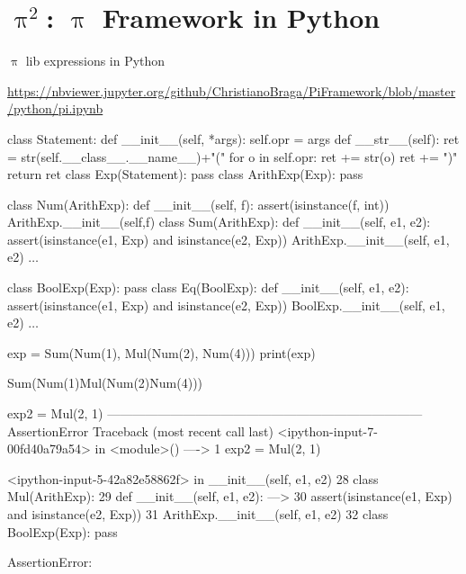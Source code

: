 \documentclass{beamer}
\begin{document}
\section{$\uppi^2$: $\uppi$ Framework in Python}

\begin{frame}{{\color{red}$\uppi$ lib} expressions in Python}

{\footnotesize\url{https://nbviewer.jupyter.org/github/ChristianoBraga/PiFramework/blob/master/python/pi.ipynb}}

\begin{python}
class Statement: 
    def __init__(self, *args):
        self.opr = args
    def __str__(self):
        ret = str(self.__class__.__name__)+"("
        for o in self.opr:
            ret += str(o)
        ret += ")"
        return ret
class Exp(Statement): pass
class ArithExp(Exp): pass
\end{python}

\framebreak

\begin{python}
class Num(ArithExp): 
    def __init__(self, f): 
        assert(isinstance(f, int))
        ArithExp.__init__(self,f)
class Sum(ArithExp): 
    def __init__(self, e1, e2): 
        assert(isinstance(e1, Exp) and isinstance(e2, Exp))
        ArithExp.__init__(self, e1, e2)
$\ldots$
\end{python}

\framebreak

\begin{python}
class BoolExp(Exp): pass
class Eq(BoolExp):
    def __init__(self, e1, e2):
        assert(isinstance(e1, Exp) and isinstance(e2, Exp))
        BoolExp.__init__(self, e1, e2)
$\ldots$
\end{python}

\framebreak

\begin{python}
exp = Sum(Num(1), Mul(Num(2), Num(4)))
print(exp)

Sum(Num(1)Mul(Num(2)Num(4)))
\end{python}

\framebreak

\begin{python}
exp2 = Mul(2, 1)
---------------------------------------------------------------------------
AssertionError                            Traceback (most recent call last)
<ipython-input-7-00fd40a79a54> in <module>()
----> 1 exp2 = Mul(2, 1)

<ipython-input-5-42a82e58862f> in __init__(self, e1, e2)
     28 class Mul(ArithExp):
     29     def __init__(self, e1, e2):
---> 30         assert(isinstance(e1, Exp) and isinstance(e2, Exp))
     31         ArithExp.__init__(self, e1, e2)
     32 class BoolExp(Exp): pass

AssertionError: 
\end{python}
\end{frame}
\end{document}
